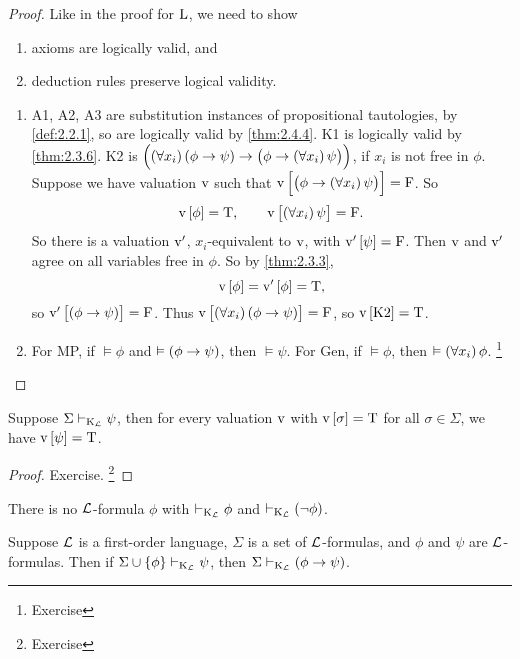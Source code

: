 \begin{proof}
Like in the proof for $ \mathrm{L} $, we need to show
\begin{enumerate}
\item axioms are logically valid, and
\item deduction rules preserve logical validity.
\end{enumerate}
\begin{enumerate}
\item A1, A2, A3 are substitution instances of propositional tautologies, by \ref{def:2.2.1}, so are logically valid by \ref{thm:2.4.4}. K1 is logically valid by \ref{thm:2.3.6}. K2 is $ \impb{\fab{x_i}\impb{\phi}{\psi}}{\impb{\phi}{\fab{x_i}\psi}} $, if $ x_i $ is not free in $ \phi $. Suppose we have valuation $ \mathrm{v} $ such that $ \v\sbr{\impb{\phi}{\fab{x_i}\psi}} = \F $. So
$$ \v\sbr{\phi} = \T, \qquad \v\sbr{\fab{x_i}\psi} = \F. $$
So there is a valuation $ \mathrm{v}' $, $ x_i $-equivalent to $ \mathrm{v} $, with $ \v'\sbr{\psi} = \F $. Then $ \mathrm{v} $ and $ \mathrm{v}' $ agree on all variables free in $ \phi $. So by \ref{thm:2.3.3},
$$ \v\sbr{\phi} = \v'\sbr{\phi} = \T, $$
so $ \v'\sbr{\impb{\phi}{\psi}} = \F $. Thus $ \v\sbr{\fab{x_i}\impb{\phi}{\psi}} = \F $, so $ \v\sbr{\text{K2}} = \T $.
\item For MP, if $ \vDash \phi $ and $ \vDash \impb{\phi}{\psi} $, then $ \vDash \psi $. For Gen, if $ \vDash \phi $, then $ \vDash \fab{x_i}\phi $. \footnote{Exercise}
\end{enumerate}
\end{proof}

\begin{example}
\label{eg:2.4.6}
Suppose $ \Sigma \vdash_{\mathrm{K}_{\mathcal{L}}} \psi $, then for every valuation $ \mathrm{v} $ with $ \v\sbr{\sigma} = \T $ for all $ \sigma \in \Sigma $, we have $ \v\sbr{\psi} = \T $.
\end{example}

\begin{proof}
Exercise. \footnote{Exercise}
\end{proof}

\begin{corollary}
\label{cor:2.4.7}
There is no $ \mathcal{L} $-formula $ \phi $ with $ \vdash_{\mathrm{K}_{\mathcal{L}}} \phi $ and $ \vdash_{\K_\LLL} \notb{\phi} $.
\end{corollary}

\begin{theorem}
Suppose $ \mathcal{L} $ is a first-order language, $ \Sigma $ is a set of $ \mathcal{L} $-formulas, and $ \phi $ and $ \psi $ are $ \mathcal{L} $-formulas. Then if $ \Sigma \cup \cbr{\phi} \vdash_{\K_\LLL} \psi $, then $ \Sigma \vdash_{\K_\LLL} \impb{\phi}{\psi} $.
\end{theorem}

